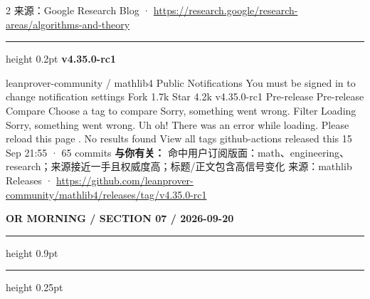 \documentclass[10.5pt]{ctexart}
\begin{document}
\begin{multicols}{2}
{\footnotesize\color{ormuted} 来源：Google Research Blog · \url{https://research.google/research-areas/algorithms-and-theory}}
\vspace{2mm}
\hrule height 0.2pt
\vspace{2mm}
{\large\bfseries v4.35.0-rc1}\par
leanprover-community / mathlib4 Public Notifications You must be signed in to change notification settings Fork 1.7k Star 4.2k v4.35.0-rc1 Pre-release Pre-release Compare Choose a tag to compare Sorry, something went wrong. Filter Loading Sorry, something went wrong. Uh oh! There was an error while loading. Please reload this page . No results found View all tags github-actions released this 15 Sep 21:55 · 65 commits
\textbf{与你有关：} 命中用户订阅版面：math、engineering、research；来源接近一手且权威度高；标题/正文包含高信号变化
{\footnotesize\color{ormuted} 来源：mathlib Releases · \url{https://github.com/leanprover-community/mathlib4/releases/tag/v4.35.0-rc1}}
\end{multicols}
\newpage
{\small\bfseries OR MORNING / SECTION 07 / 2026-09-20}
\vspace{2mm}
\hrule height 0.9pt
\vspace{1.5mm}
\hrule height 0.25pt
\vspace{4mm}
\end{document}
